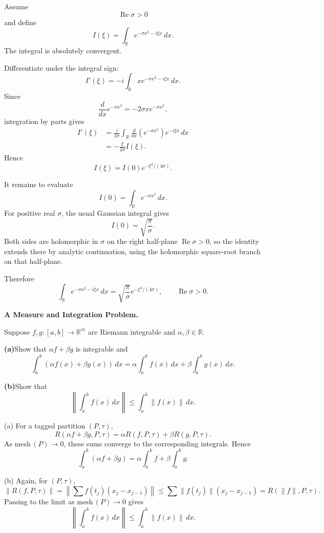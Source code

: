 \begin{solution}
Assume
\[
\operatorname{Re}\sigma>0
\]
and define
\[
I(\xi)
=
\int_{\mathbb R}
e^{-\sigma x^2-i\xi x}\,dx.
\]
The integral is absolutely convergent.

Differentiate under the integral sign:
\[
I'(\xi)
=
-i
\int_{\mathbb R}
x e^{-\sigma x^2-i\xi x}\,dx.
\]
Since
\[
\frac{d}{dx}e^{-\sigma x^2}
=
-2\sigma x e^{-\sigma x^2},
\]
integration by parts gives
\[
\begin{aligned}
I'(\xi)
&=
\frac{i}{2\sigma}
\int_{\mathbb R}
\frac{d}{dx}
\left(e^{-\sigma x^2}\right)
e^{-i\xi x}\,dx\\
&=
-\frac{\xi}{2\sigma}
I(\xi).
\end{aligned}
\]
Hence
\[
I(\xi)
=
I(0)
e^{-\xi^2/(4\sigma)}.
\]

It remains to evaluate
\[
I(0)
=
\int_{\mathbb R}e^{-\sigma x^2}\,dx.
\]
For positive real \(\sigma\), the usual Gaussian integral gives
\[
I(0)=\sqrt{\frac{\pi}{\sigma}}.
\]
Both sides are holomorphic in \(\sigma\) on the right half-plane
\(\operatorname{Re}\sigma>0\), so the identity extends there by analytic continuation, using
the holomorphic square-root branch on that half-plane.

Therefore
\[
\boxed{
\int_{\mathbb R}
e^{-\sigma x^2-i\xi x}\,dx
=
\sqrt{\frac{\pi}{\sigma}}
e^{-\xi^2/(4\sigma)},
\qquad
\operatorname{Re}\sigma>0.
}
\]
\end{solution}


\begin{problem}[CP-II-0524]
\label{prob:cp-ii-0524}
\textbf{A Measure and Integration Problem.}

\hspace*{1.5em}Suppose $f,g:[a,b]\to\mathbb{R}^m$ are Riemann integrable and $\alpha,\beta\in\mathbb{R}$.

	\par\smallskip\noindent\textbf{(a)}\quad Show that $\alpha f+\beta g$ is integrable and
	\[
	\int_a^b (\alpha f(x)+\beta g(x))\,dx
	= \alpha \int_a^b f(x)\,dx + \beta \int_a^b g(x)\,dx.
	\]

	\par\smallskip\noindent\textbf{(b)}\quad Show that
	\[
	\left\|\int_a^b f(x)\,dx\right\| \leq \int_a^b \|f(x)\|\,dx.
	\]
\end{problem}

\begin{solution}
(a) For a tagged partition $(P,\tau)$,
	\[
	R(\alpha f+\beta g,P,\tau)=\alpha R(f,P,\tau)+\beta R(g,P,\tau).
	\]
	As mesh$\,(P)\to 0$, these sums converge to the corresponding integrals. Hence
	\[
	\int_a^b (\alpha f+\beta g)=\alpha\int_a^b f + \beta\int_a^b g.
	\]

	(b) Again, for $(P,\tau)$,
	\[
	\left\|R(f,P,\tau)\right\|
	=\left\|\sum f(t_j)(x_j-x_{j-1})\right\|
	\leq \sum \|f(t_j)\|(x_j-x_{j-1})
	=R(\|f\|,P,\tau).
	\]
	Passing to the limit as mesh$\,(P)\to 0$ gives
	\[
	\left\|\int_a^b f(x)\,dx\right\| \leq \int_a^b \|f(x)\|\,dx.
	\]
\end{solution}

